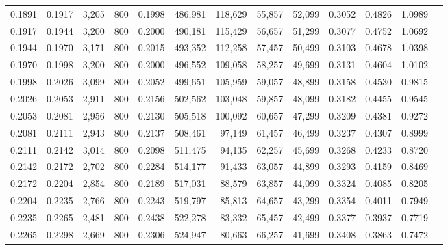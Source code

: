 \begin{tabular}{rrrrrrrrrrrrr}
0.1891 & 0.1917 &  3,205 &   800 &                                     0.1998 & 486,981 & 118,629 &  55,857 &  52,099 & 0.3052 & 0.4826 & 1.0989 \\
0.1917 & 0.1944 &  3,200 &   800 &                                     0.2000 & 490,181 & 115,429 &  56,657 &  51,299 & 0.3077 & 0.4752 & 1.0692 \\
0.1944 & 0.1970 &  3,171 &   800 &                                     0.2015 & 493,352 & 112,258 &  57,457 &  50,499 & 0.3103 & 0.4678 & 1.0398 \\
0.1970 & 0.1998 &  3,200 &   800 &                                     0.2000 & 496,552 & 109,058 &  58,257 &  49,699 & 0.3131 & 0.4604 & 1.0102 \\
0.1998 & 0.2026 &  3,099 &   800 &                                     0.2052 & 499,651 & 105,959 &  59,057 &  48,899 & 0.3158 & 0.4530 & 0.9815 \\
0.2026 & 0.2053 &  2,911 &   800 &                                     0.2156 & 502,562 & 103,048 &  59,857 &  48,099 & 0.3182 & 0.4455 & 0.9545 \\
0.2053 & 0.2081 &  2,956 &   800 &                                     0.2130 & 505,518 & 100,092 &  60,657 &  47,299 & 0.3209 & 0.4381 & 0.9272 \\
0.2081 & 0.2111 &  2,943 &   800 &                                     0.2137 & 508,461 &  97,149 &  61,457 &  46,499 & 0.3237 & 0.4307 & 0.8999 \\
0.2111 & 0.2142 &  3,014 &   800 &                                     0.2098 & 511,475 &  94,135 &  62,257 &  45,699 & 0.3268 & 0.4233 & 0.8720 \\
0.2142 & 0.2172 &  2,702 &   800 &                                     0.2284 & 514,177 &  91,433 &  63,057 &  44,899 & 0.3293 & 0.4159 & 0.8469 \\
0.2172 & 0.2204 &  2,854 &   800 &                                     0.2189 & 517,031 &  88,579 &  63,857 &  44,099 & 0.3324 & 0.4085 & 0.8205 \\
0.2204 & 0.2235 &  2,766 &   800 &                                     0.2243 & 519,797 &  85,813 &  64,657 &  43,299 & 0.3354 & 0.4011 & 0.7949 \\
0.2235 & 0.2265 &  2,481 &   800 &                                     0.2438 & 522,278 &  83,332 &  65,457 &  42,499 & 0.3377 & 0.3937 & 0.7719 \\
0.2265 & 0.2298 &  2,669 &   800 &                                     0.2306 & 524,947 &  80,663 &  66,257 &  41,699 & 0.3408 & 0.3863 & 0.7472 \\

\end{tabular}
